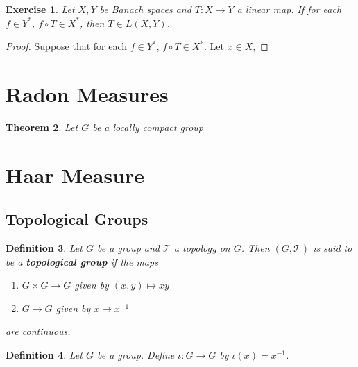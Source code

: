 \documentclass[12pt]{amsart}
\newtheorem{thm}{Theorem}[subsection]
\newtheorem{defn}[thm]{Definition}
\newtheorem{ex}[thm]{Exercise}
\newcommand{\MT}{\mathcal{T}}
\begin{document}
	\begin{ex}
		Let $X, Y$ be Banach spaces and $T:X \rightarrow Y$ a linear map. If for each $f \in Y^*$, $f \circ T \in X^*$, then $T \in L(X,Y)$. 
	\end{ex}
	
	\begin{proof}
		Suppose that for each $f \in Y^*$, $f \circ T \in X^*$. Let $x \in X$, 
	\end{proof}
	
	\newpage
	
	
	
	
	
	
	
	
	
	
	
	
	\section{Radon Measures}
	\begin{thm}
		Let $G$ be a locally compact group 
	\end{thm}
	
	
	
	
	\newpage
	
	
	
	
	
	
	
	
	
	
	\section{Haar Measure}
	
	\subsection{Topological Groups}
	\begin{defn}
		Let $G$ be a group and $\MT$ a topology on $G$. Then $(G, \MT)$ is said to be a \textbf{topological group} if the maps \begin{enumerate}
			\item $G \times G \rightarrow G$ given by $(x,y) \mapsto xy$
			\item  $G \rightarrow G$ given by $x \mapsto x^{-1}$ 
		\end{enumerate} are continuous.
	\end{defn}
	
	\begin{defn}
		Let $G$ be a group. Define $\iota:G \rightarrow G$ by $\iota(x) = x^{-1}$. 
	\end{defn}
	
\end{document}
